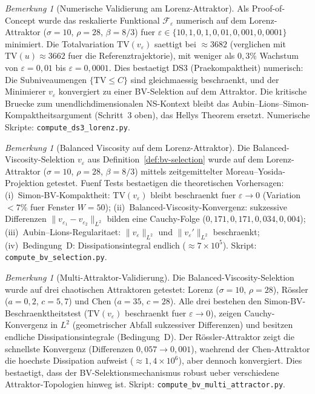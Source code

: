 \documentclass[12pt,a4paper]{article}
\theoremstyle{definition}
\theoremstyle{plain}
\theoremstyle{remark}
\newtheorem{remark}[definition]{Bemerkung}
\begin{document}
\begin{remark}[Numerische Validierung am Lorenz-Attraktor]\label{rem:ds3-lorenz}
Als Proof-of-Concept wurde das reskalierte Funktional $\mathcal{F}_\varepsilon$ numerisch auf dem Lorenz-Attraktor ($\sigma = 10$, $\rho = 28$, $\beta = 8/3$) fuer $\varepsilon \in \{10, 1, 0{,}1, 0{,}01, 0{,}001, 0{,}0001\}$ minimiert. Die Totalvariation $\mathrm{TV}(v_\varepsilon)$ saettigt bei $\approx 3682$ (verglichen mit $\mathrm{TV}(u) \approx 3662$ fuer die Referenztrajektorie), mit weniger als $0{,}3\%$ Wachstum von $\varepsilon = 0{,}01$ bis $\varepsilon = 0{,}0001$. Dies bestaetigt DS3 (Praekompaktheit) numerisch: Die Subniveaumengen $\{\mathrm{TV} \leq C\}$ sind gleichmaessig beschraenkt, und der Minimierer $v_\varepsilon$ konvergiert zu einer BV-Selektion auf dem Attraktor. Die kritische Bruecke zum unendlichdimensionalen NS-Kontext bleibt das Aubin--Lions--Simon-Kompaktheitsargument (Schritt~3 oben), das Hellys Theorem ersetzt. Numerische Skripte: \texttt{compute\_ds3\_lorenz.py}.
\end{remark}

\begin{remark}[Balanced Viscosity auf dem Lorenz-Attraktor]
\label{rem:bv-lorenz}
Die Balanced-Viscosity-Selektion $v_\varepsilon$ aus Definition~\ref{def:bv-selection} wurde auf dem Lorenz-Attraktor ($\sigma=10$, $\rho=28$, $\beta=8/3$) mittels zeitgemittelter Moreau--Yosida-Projektion getestet. Fuenf Tests bestaetigen die theoretischen Vorhersagen: (i)~Simon-BV-Kompaktheit: $\mathrm{TV}(v_\varepsilon)$ bleibt beschraenkt fuer $\varepsilon \to 0$ (Variation $< 7\%$ fuer Fenster $W=50$); (ii)~Balanced-Viscosity-Konvergenz: sukzessive Differenzen $\|v_{\varepsilon_1} - v_{\varepsilon_2}\|_{L^2}$ bilden eine Cauchy-Folge ($0{,}171, 0{,}171, 0{,}034, 0{,}004$); (iii)~Aubin--Lions-Regularitaet: $\|v_\varepsilon\|_{L^2}$ und $\|v_\varepsilon'\|_{L^2}$ beschraenkt; (iv)~Bedingung~D: Dissipationsintegral endlich ($\approx 7 \times 10^5$). Skript: \texttt{compute\_bv\_selection.py}.
\end{remark}

\begin{remark}[Multi-Attraktor-Validierung]
\label{rem:multi-attractor}
Die Balanced-Viscosity-Selektion wurde auf drei chaotischen Attraktoren getestet: Lorenz ($\sigma=10$, $\rho=28$), R\"ossler ($a=0{,}2$, $c=5{,}7$) und Chen ($a=35$, $c=28$). Alle drei bestehen den Simon-BV-Beschraenktheitstest ($\mathrm{TV}(v_\varepsilon)$ beschraenkt fuer $\varepsilon \to 0$), zeigen Cauchy-Konvergenz in $L^2$ (geometrischer Abfall sukzessiver Differenzen) und besitzen endliche Dissipationsintegrale (Bedingung~D). Der R\"ossler-Attraktor zeigt die schnellste Konvergenz (Differenzen $0{,}057 \to 0{,}001$), waehrend der Chen-Attraktor die hoechste Dissipation aufweist ($\approx 1{,}4 \times 10^6$), aber dennoch konvergiert. Dies bestaetigt, dass der BV-Selektionsmechanismus robust ueber verschiedene Attraktor-Topologien hinweg ist. Skript: \texttt{compute\_bv\_multi\_attractor.py}.
\end{remark}
\end{document}
